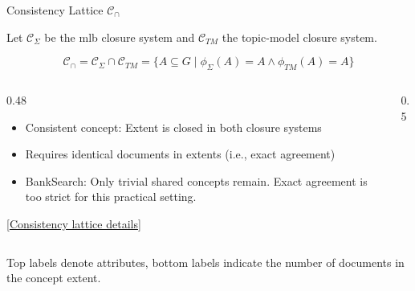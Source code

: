 \begin{frame}{Consistency Lattice $\mathcal{C}_{\cap}$}
\hypertarget{main:consistency-overview}{}

    Let $\mathcal{C}_{\Sigma}$ be the \ac{mlb} closure system and $\mathcal{C}_{TM}$ the topic-model closure system. 

\[
\mathcal{C}_{\cap}
= \mathcal{C}_{\Sigma}\cap\mathcal{C}_{TM}
= \{A\subseteq G \mid \phi_{\Sigma}(A)=A \land \phi_{TM}(A)=A\}
\]

\begin{columns}[T,onlytextwidth]
\begin{column}{0.48\textwidth}
\begin{itemize}
    \item<2-> Consistent concept: Extent is closed in both closure systems
    \item[$\rightarrow$]<3-> Requires identical documents in extents (i.e., exact agreement)
    \vspace{0.5em}
    \item[\danger]<4-> BankSearch: Only trivial shared concepts remain. Exact agreement is too strict for this practical setting.
\end{itemize}
{\tiny[\hyperlink{appendix:consistency-detail}{Consistency lattice details}]}
\end{column}
\begin{column}{0.5\textwidth}
\vspace{-1em}
\centering

\end{column}
\end{columns}
\vspace{-0.25em}
{\small 
Top labels denote attributes, bottom labels indicate the number of documents in the concept extent.
}
\end{frame}


